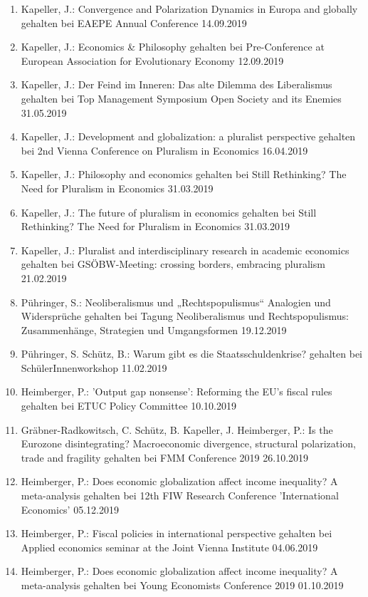 \begin{enumerate}
	\item Kapeller, J.: Convergence and Polarization Dynamics in Europa and globally gehalten bei EAEPE Annual Conference 14.09.2019
	\item Kapeller, J.: Economics \& Philosophy gehalten bei Pre-Conference at European Association for Evolutionary Economy 12.09.2019
	\item Kapeller, J.: Der Feind im Inneren: Das alte Dilemma des Liberalismus gehalten bei Top Management Symposium \glqq Open Society and its Enemies\grqq{} 31.05.2019
	\item Kapeller, J.: Development and globalization: a pluralist perspective gehalten bei 2nd Vienna Conference on Pluralism in Economics 16.04.2019
	\item Kapeller, J.: Philosophy and economics gehalten bei Still Rethinking? The Need for Pluralism in Economics 31.03.2019
	\item Kapeller, J.: The future of pluralism in economics gehalten bei Still Rethinking? The Need for Pluralism in Economics 31.03.2019
	\item Kapeller, J.: Pluralist and interdisciplinary research in academic economics gehalten bei GSÖBW-Meeting: \glqq crossing borders, embracing pluralism\grqq{} 21.02.2019
	\item Pühringer, S.: Neoliberalismus und „Rechtspopulismus“ Analogien und Widersprüche gehalten bei Tagung Neoliberalismus und Rechtspopulismus: Zusammenhänge, Strategien und Umgangsformen 19.12.2019
	\item Pühringer, S. Schütz, B.: Warum gibt es die Staatsschuldenkrise? gehalten bei SchülerInnenworkshop 11.02.2019
	\item Heimberger, P.: 'Output gap nonsense': Reforming the EU's fiscal rules gehalten bei ETUC Policy Committee 10.10.2019
	\item Gräbner-Radkowitsch, C. Schütz, B. Kapeller, J. Heimberger, P.: Is the Eurozone disintegrating? Macroeconomic divergence, structural polarization, trade and fragility gehalten bei FMM Conference 2019 26.10.2019
	\item Heimberger, P.: Does economic globalization affect income inequality? A meta-analysis gehalten bei 12th FIW Research Conference 'International Economics' 05.12.2019
	\item Heimberger, P.: Fiscal policies in international perspective gehalten bei Applied economics seminar at the Joint Vienna Institute 04.06.2019
	\item Heimberger, P.: Does economic globalization affect income inequality? A meta-analysis gehalten bei Young Economists Conference 2019 01.10.2019

\end{enumerate}

